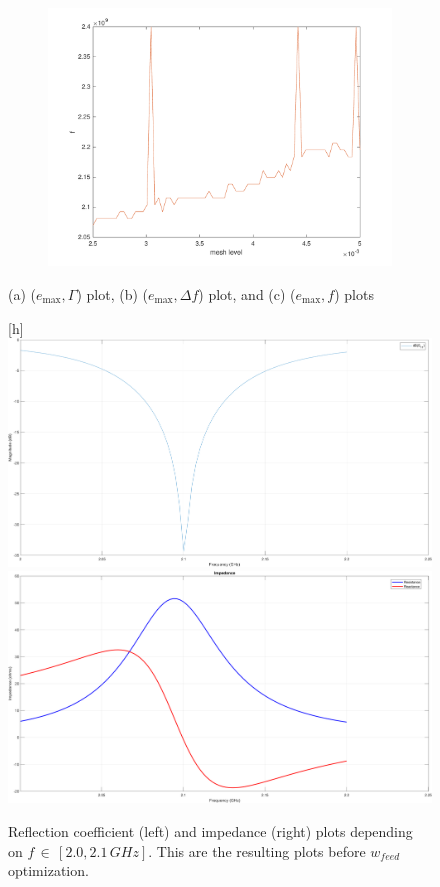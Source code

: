 \documentclass[12pt,a4paper]{article}
\begin{document}
{\begin{figure}[h]
\begin{center}
\begin{subfigure}{0.3\linewidth}
			\includegraphics[scale=0.3]{F_vs_mesh_level.pdf}
			\caption{}
			\label{eq:f vs mesh}
		\end{subfigure}
		\caption{\selectfont (a) ($e_{\max},\Gamma$) plot, (b) ($e_{\max},\Delta f$) plot, and (c) ($e_{\max},f$) plots} 
	\end{center}
\end{figure}

	\begin{figure}
		\begin{center}[h]
		\includegraphics[width = 0.5\linewidth]{gamma.png}
		\includegraphics[width = 0.5\linewidth]{impedances.png}
		\caption{Reflection coefficient (left) and impedance (right) plots depending on $f\,\in\,[2.0,2.1\,GHz]$. This are the resulting plots before $w_{feed}$ optimization.}
        \label{fig:Gamma and Z previa wfeed}
	\end{center}
	\end{figure}

}
\end{document}
